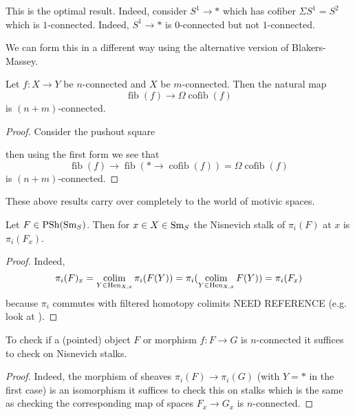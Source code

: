 \documentclass[12pt]{article}
\DeclareMathOperator{\fib}{\mathrm{fib}}
\DeclareMathOperator{\cofib}{\mathrm{cofib}}
\begin{document}
\begin{rmk}
This is the optimal result. Indeed, consider $S^1 \to *$ which has cofiber $\Sigma S^1 = S^2$ which is $1$-connected. Indeed, $S^1 \to *$ is $0$-connected but not $1$-connected.
\end{rmk}

We can form this in a different way using the alternative version of Blakers-Massey.

\begin{prop}
Let $f : X \to Y$ be $n$-connected and $X$ be $m$-connected. Then the natural map 
\[ \fib(f) \to \Omega \cofib(f) \]
is $(n+m)$-connected.
\end{prop}

\begin{proof}
Consider the pushout square
\begin{center}
\end{center}
then using the first form we see that
\[ \fib(f) \to \fib(* \to \cofib(f)) = \Omega \cofib(f) \]
is $(n + m)$-connected. 
\end{proof}

These above results carry over completely to the world of motivic spaces.

\newcommand{\Hen}{\mathrm{Hen}}

\begin{lemma}
Let $F \in \mathrm{PSh}(\mathrm{Sm}_S)$. Then for $x \in X \in \mathrm{Sm}_S$ the Nisnevich stalk of $\pi_i(F)$ at $x$ is $\pi_i(F_x)$.
\end{lemma}

\begin{proof}
Indeed, 
\[ \pi_i(F)_x = \colim_{Y \in \Hen_{X,x}} \pi_i(F(Y)) = \pi_i(\colim_{Y \in \Hen_{X,x}} F(Y)) = \pi_i(F_x) \] 
because $\pi_i$ commutes with filtered homotopy colimits {\color{red} NEED REFERENCE} (e.g. look at ). 
\end{proof}

\begin{cor}
To check if a (pointed) object $F$ or morphism $f : F \to G$ is $n$-connected it suffices to check on Nisnevich stalks. 
\end{cor}

\begin{proof}
Indeed, the morphism of sheaves $\pi_i(F) \to \pi_i(G)$ (with $Y = *$ in the first case) is an isomorphism it suffices to check this on stalks which is the same as checking the corresponding map of spaces $F_x \to G_x$ is $n$-connected. 
\end{proof}
\end{document}
